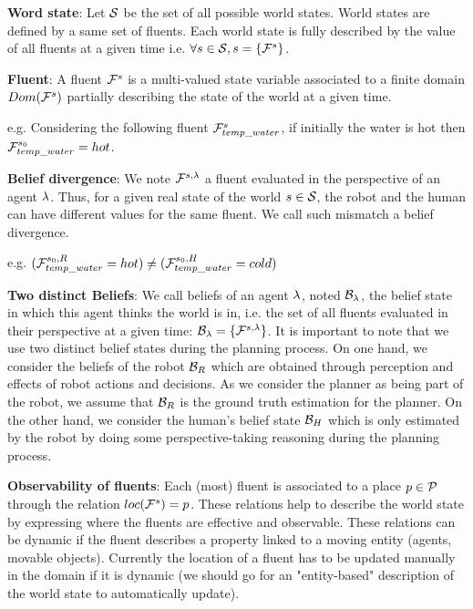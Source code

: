 \documentclass[letterpaper]{article} %
\begin{document}
\textbf{Word state}: 
Let $\mathcal{S}$ be the set of all possible world states. World states are defined by a same set of fluents. Each world state is fully described by the value of all fluents at a given time i.e. $\forall s\in\mathcal{S}, s=\{ \mathcal{F}^{s}_{} \}$.

\textbf{Fluent}: 
A fluent $\mathcal{F}^{s}_{}$ is a multi-valued state variable associated to a finite domain $Dom(\mathcal{F}^{s}_{})$ partially describing the state of the world at a given time.

e.g. Considering the following fluent $\mathcal{F}^{s}_{temp\_water}$, if initially the water is hot then $\mathcal{F}^{s_0}_{temp\_water}=hot$.

\textbf{Belief divergence}: 
We note $\mathcal{F}^{s,\lambda}_{}$ a fluent evaluated in the perspective of an agent $\lambda$. Thus, for a given real state of the world $s\in\mathcal{S}$, the robot and the human can have different values for the same fluent. We call such mismatch a belief divergence.

e.g. $(\mathcal{F}^{s_0,R}_{temp\_water}=hot) \neq (\mathcal{F}^{s_0,H}_{temp\_water}=cold)$

\textbf{Two distinct Beliefs}: 
We call beliefs of an agent $\lambda$, noted $\mathcal{B}_\lambda$, the belief state in which this agent thinks the world is in, i.e. the set of all fluents evaluated in their perspective at a given time: $\mathcal{B}_\lambda=\{ \mathcal{F}^{s,\lambda}_{} \}$. It is important to note that we use two distinct belief states during the planning process. On one hand, we consider the beliefs of the robot $\mathcal{B}_R$ which are obtained through perception and effects of robot actions and decisions. As we consider the planner as being part of the robot, we assume that $\mathcal{B}_R$ is the ground truth estimation for the planner. On the other hand, we consider the human's belief state $\mathcal{B}_H$ which is only estimated by the robot by doing some perspective-taking reasoning during the planning process.

\textbf{Observability of fluents}:
Each (most) fluent is associated to a place $p \in \mathcal{P}$ through the relation $loc( \mathcal{F}^{s}_{} )=p$. These relations help to describe the world state by expressing where the fluents are effective and observable. These relations can be dynamic if the fluent describes a property linked to a moving entity (agents, movable objects). Currently the location of a fluent has to be updated manually in the domain if it is dynamic (we should go for an "entity-based" description of the world state to automatically update).
\end{document}
